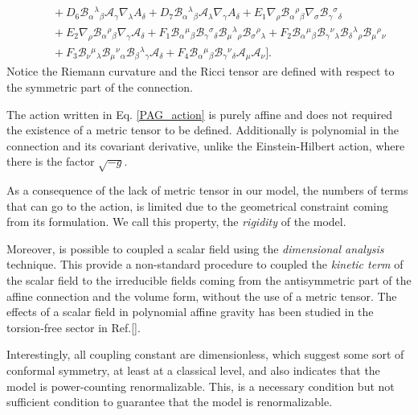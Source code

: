 \documentclass{article}
\begin{document}
\begin{equation}
\begin{split}
    &\quad
    + D_6 \mathcal{B}_{\alpha}{}^{\lambda}{}_{\beta}\mathcal{A}_\gamma \nabla_\lambda A_\delta
    + D_7\mathcal{B}_{\alpha}{}^{\lambda}{}_{\beta} \mathcal{A}_\lambda \nabla_\gamma A_\delta
    + E_1\nabla_\rho \mathcal{B}_{\alpha}{}^{\rho}{}_{\beta} \nabla_\sigma \mathcal{B}_{\gamma}{}^{\sigma}{}_{\delta}
    \\
    &\quad
    + E_2 \nabla_\rho \mathcal{B}_{\alpha}{}^{\rho}{}_{\beta} \nabla_\gamma \mathcal{A}_\delta
    + F_1 \mathcal{B}_{\alpha}{}^{\mu}{}_{\beta} \mathcal{B}_{\gamma}{}^{\sigma}{}_{\delta} \mathcal{B}_{\mu}{}^{\lambda}{}_{\rho} \mathcal{B}_{\sigma}{}^{\rho}{}_{\lambda}
    + F_2\mathcal{B}_{\alpha}{}^{\mu}{}_{\beta} \mathcal{B}_{\gamma}{}^{\nu}{}_{\lambda} \mathcal{B}_{\delta}{}^{\lambda}{}_{\rho} \mathcal{B}_{\mu}{}^{\rho}{}_{\nu}
    \\
    &\quad
    + F_3 \mathcal{B}_{\nu}{}^{\mu}{}_{\lambda} \mathcal{B}_{\mu}{}^{\nu}{}_{\alpha} \mathcal{B}_{\beta}{}^{\lambda}{}_{\gamma} \mathcal{A}_\delta
    + F_4 \mathcal{B}_{\alpha}{}^{\mu}{}_{\beta}\mathcal{B}_{\gamma}{}^{\nu}{}_{\delta}\mathcal{A}_\mu \mathcal{A}_\nu \bigg].
    \end{split}
\end{equation}
Notice the Riemann curvature and the Ricci tensor are defined with respect to the symmetric part
of the connection.

The action written in Eq. \eqref{PAG_action} is purely affine and does not required the 
existence of a metric tensor to be defined. Additionally is polynomial in the connection
and its covariant derivative, unlike the Einstein-Hilbert action, where there is 
the factor $\sqrt{-g}$.

As a consequence of the lack of metric tensor in our model, the numbers of terms that can
go to the action, is limited due to the geometrical constraint coming from its formulation. 
We call this property, the \textit{rigidity} of the model. 

Moreover, is possible to coupled a scalar field using the \textit{dimensional analysis}
technique. This provide a non-standard procedure to coupled the \textit{kinetic term}
of the scalar field to the irreducible fields coming from the antisymmetric part
of the affine connection and the volume form, without the use of a metric tensor. 
The effects of a scalar field in polynomial affine gravity has been studied in the
torsion-free sector in Ref.[].

Interestingly, all coupling constant are dimensionless, which suggest some sort of
conformal symmetry, at least at a classical level, and also indicates that the
model is power-counting renormalizable. This, is a necessary condition but not
sufficient condition to guarantee that the model is renormalizable.
\end{document}
